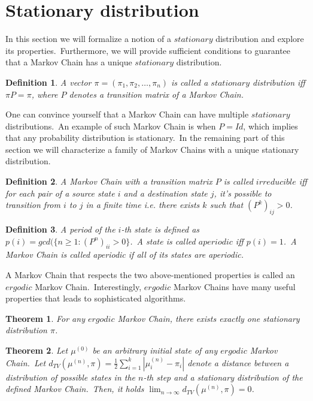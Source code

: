\documentclass[a4paper, 11pt, onecolumn, openany, titlepage]{report}
\theoremstyle{default_theorem_style}\newtheorem{theorem}{Theorem}
\theoremstyle{default_theorem_style}\newtheorem{definition}{Definition}
\begin{document}
\section{Stationary distribution}

In this section we will formalize a notion of a $stationary$ distribution and explore its properties.\ Furthermore,
we will provide sufficient conditions to guarantee that a Markov Chain has a unique $stationary$ distribution.

\begin{definition}
A vector $\pi = (\pi_1, \pi_2, \dots, \pi_n)$ is called a $stationary$ distribution iff $\pi P = \pi$, where $P$
denotes a transition matrix of a Markov Chain.
\end{definition}

One can convince yourself that a Markov Chain can have multiple $stationary$ distributions.\ An example of such Markov
Chain is when $P = Id$, which implies that any probability distribution is stationary.\ In the remaining part of this
section we will characterize a family of Markov Chains with a unique stationary distribution.

\begin{definition}
A Markov Chain with a transition matrix $P$ is called $irreducible$ iff for each pair of a source state $i$ and
a destination state $j$, it's possible to transition from $i$ to $j$ in a finite time i.e. there exists $k$ such that
$(P^k)_{ij} > 0$.
\end{definition}

\begin{definition}
A period of the $i$-th state is defined as $p(i) = gcd(\{n \geq 1 : (P^n)_{ii} > 0\}$.\ A state is called
$aperiodic$ iff $p(i) = 1$.\ A Markov Chain is called aperiodic if all of its states are aperiodic.
\end{definition}

A Markov Chain that respects the two above-mentioned properties is called an $ergodic$ Markov Chain.\ Interestingly,
$ergodic$ Markov Chains have many useful properties that leads to sophisticated algorithms.

\begin{theorem}\label{thm:one_stationary}
For any $ergodic$ Markov Chain, there exists exactly one stationary distribution $\pi$.
\end{theorem}

\begin{theorem}\label{thm:converges_to_stationary}
Let $\mu^{(0)}$ be an arbitrary initial state of any $ergodic$ Markov Chain.\ Let
$d_{TV}(\mu^{(n)}, \pi) = \frac{1}{2} \sum_{i = 1}^{k} |\mu_i^{(n)} - \pi_i|$ denote a distance between a
distribution of possible states in the $n$-th step and a stationary distribution of the defined Markov Chain.\ Then,
it holds $\lim_{n \to \infty} d_{TV}(\mu^{(n)}, \pi) = 0$.
\end{theorem}
\end{document}
